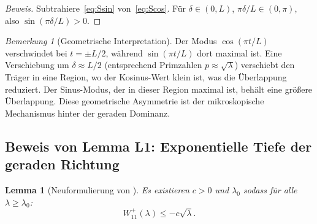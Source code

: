 \documentclass[12pt,a4paper]{article}
\newtheorem{lemma}[theorem]{Lemma}
\theoremstyle{definition}
\theoremstyle{remark}
\newtheorem{remark}[theorem]{Bemerkung}
\begin{document}
\begin{proof}[Beweis]
Subtrahiere~\eqref{eq:Ssin} von~\eqref{eq:Scos}. Für $\delta \in (0, L)$, $\pi\delta/L \in (0, \pi)$, also $\sin(\pi\delta/L) > 0$.
\end{proof}

\begin{remark}[Geometrische Interpretation]
Der Modus $\cos(\pi t/L)$ verschwindet bei $t = \pm L/2$, während $\sin(\pi t/L)$ dort maximal ist. Eine Verschiebung um $\delta \approx L/2$ (entsprechend Primzahlen $p \approx \sqrt{\lambda}$) verschiebt den Träger in eine Region, wo der Kosinus-Wert klein ist, was die Überlappung reduziert. Der Sinus-Modus, der in dieser Region maximal ist, behält eine größere Überlappung. Diese geometrische Asymmetrie ist der mikroskopische Mechanismus hinter der geraden Dominanz.
\end{remark}

\subsection{Beweis von Lemma L1: Exponentielle Tiefe der geraden Richtung}

\begin{lemma}[Neuformulierung von ]
Es existieren $c > 0$ und $\lambda_0$ sodass für alle $\lambda \geq \lambda_0$:
\[
  W_{11}^+(\lambda) \leq -c\sqrt{\lambda}.
\]
\end{lemma}
\end{document}
